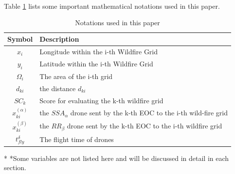 \documentclass[12pt]{ctexart}
\begin{document}
Table \ref{tb:notation} lists some important mathematical notations used in this paper.
\begin{table}[htbp]%
	\begin{center}
		\caption{Notations used in this paper}
		\begin{tabular}{cl}
			\toprule[1.5pt]
			\multicolumn{1}{m{4cm}}{\centering \textbf{Symbol}}
			                      & \multicolumn{1}{m{10cm}}{\textbf{ Description} }                       \\
			\midrule
			$x_i$                 & Longitude within the i-th Wildfire Grid                                \\
			$y_i$                 & Latitude within the i-th Wildfire Grid                                 \\
			$\varOmega _i$        & The area of the i-th grid                                              \\
			$d_{ki}$              & the distance $d_{ki}$                                                  \\
			$SC_k$                & Score for evaluating the k-th wildfire grid                            \\
			\vspace{5pt}%
			$x^{( \alpha )}_{ki}$ & the $SSA_\alpha$ drone sent by the k-th EOC to the i-th wild-fire grid \\
			\vspace{3pt}
			$x^{( \beta )}_{ki}$  & the $RR_\beta$ drone sent by the k-th EOC to the i-th wildfire grid    \\
			$t_{fly}^{\delta}$    & The flight time of drones                                              \\
			\bottomrule[1.5pt]
		\end{tabular}\label{tb:notation}
		\begin{tablenotes}
			\footnotesize
			\item[*] *Some variables are not listed here and will be discussed in detail in each section. %
		\end{tablenotes}
	\end{center}
\end{table}
\vspace{-1cm}%
\end{document}
